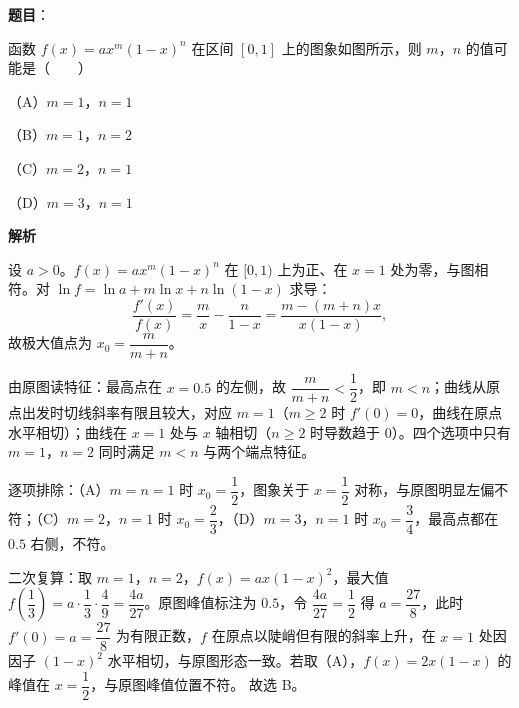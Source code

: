 \begin{answer}

\textbf{题目}：

函数 $f(x)=ax^m(1-x)^n$ 在区间 $[0,1]$ 上的图象如图所示，则 $m$，$n$ 的值可能是\mbox{（　　）}

（A）$m=1$，$n=1$

（B）$m=1$，$n=2$

（C）$m=2$，$n=1$

（D）$m=3$，$n=1$
\nopagebreak[4]
\begin{center}\end{center}
\nopagebreak[4]
\textbf{解析}

设 $a>0$。$f(x)=ax^m(1-x)^n$ 在 $[0,1)$ 上为正、在 $x=1$ 处为零，与图相符。对 $\ln f=\ln a+m\ln x+n\ln(1-x)$ 求导：
\nopagebreak[4]
\[\frac{f'(x)}{f(x)}=\frac{m}{x}-\frac{n}{1-x}=\frac{m-(m+n)x}{x(1-x)},\]
故极大值点为 $x_0=\dfrac{m}{m+n}$。

由原图读特征：最高点在 $x=0.5$ 的左侧，故 $\dfrac{m}{m+n}<\dfrac12$，即 $m<n$；曲线从原点出发时切线斜率有限且较大，对应 $m=1$（$m\geqslant2$ 时 $f'(0)=0$，曲线在原点水平相切）；曲线在 $x=1$ 处与 $x$ 轴相切（$n\geqslant2$ 时导数趋于 $0$）。四个选项中只有 $m=1$，$n=2$ 同时满足 $m<n$ 与两个端点特征。

逐项排除：（A）$m=n=1$ 时 $x_0=\dfrac12$，图象关于 $x=\dfrac12$ 对称，与原图明显左偏不符；（C）$m=2$，$n=1$ 时 $x_0=\dfrac23$，（D）$m=3$，$n=1$ 时 $x_0=\dfrac34$，最高点都在 $0.5$ 右侧，不符。

二次复算：取 $m=1$，$n=2$，$f(x)=ax(1-x)^2$，最大值 $f\left(\dfrac13\right)=a\cdot\dfrac13\cdot\dfrac49=\dfrac{4a}{27}$。原图峰值标注为 $0.5$，令 $\dfrac{4a}{27}=\dfrac12$ 得 $a=\dfrac{27}{8}$，此时 $f'(0)=a=\dfrac{27}{8}$ 为有限正数，$f$ 在原点以陡峭但有限的斜率上升，在 $x=1$ 处因因子 $(1-x)^2$ 水平相切，与原图形态一致。若取（A），$f(x)=2x(1-x)$ 的峰值在 $x=\dfrac12$，与原图峰值位置不符。
故选 B。


\end{answer}
